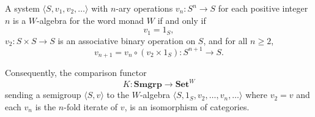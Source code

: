 A system $\langle S, v_1, v_2, \ldots \rangle$ with $n$-ary operations $v_n: S^n \to S$ for each positive integer $n$ is a $W$-algebra for the word monad $W$ if and only if
$$v_1 = 1_S,$$
$v_2: S \times S \to S$ is an associative binary operation on $S$, and for all $n \geq 2$,
$$v_{n+1} = v_n \circ (v_2 \times 1_S) : S^{n+1} \to S.$$

Consequently, the comparison functor
$$K: \mathbf{Smgrp} \to \mathbf{Set}^W$$
sending a semigroup $\langle S, v \rangle$ to the $W$-algebra $\langle S, 1_S, v_2, \ldots, v_n, \ldots \rangle$ where $v_2 = v$ and each $v_n$ is the $n$-fold iterate of $v$, is an isomorphism of categories.
